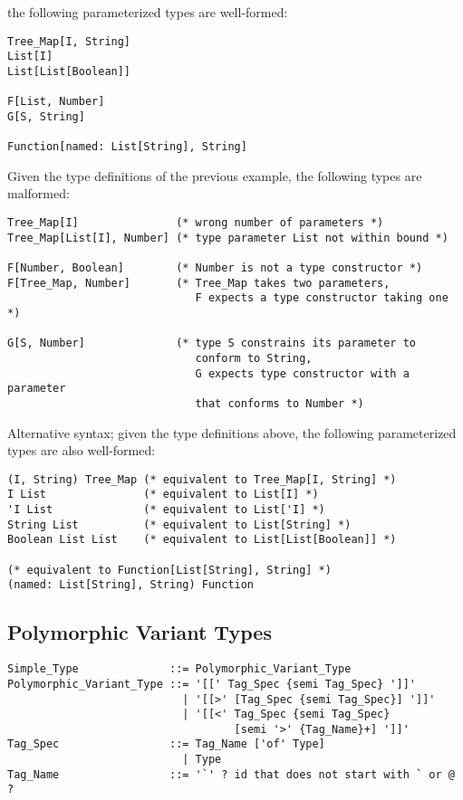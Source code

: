 the following parameterized types are well-formed: 

\begin{lstlisting}
Tree_Map[I, String]
List[I]
List[List[Boolean]]

F[List, Number]
G[S, String]

Function[named: List[String], String]
\end{lstlisting}

\example
\label{example:parameterized-types-mal}

Given the type definitions of the previous example, the following types are malformed: 

\begin{lstlisting}
Tree_Map[I]               (* wrong number of parameters *)
Tree_Map[List[I], Number] (* type parameter List not within bound *)

F[Number, Boolean]        (* Number is not a type constructor *)
F[Tree_Map, Number]       (* Tree_Map takes two parameters, 
                             F expects a type constructor taking one *)

G[S, Number]              (* type S constrains its parameter to
                             conform to String, 
                             G expects type constructor with a parameter
                             that conforms to Number *)
\end{lstlisting}

\example Alternative syntax; given the type definitions above, the following parameterized types are also well-formed:

\begin{lstlisting}
(I, String) Tree_Map (* equivalent to Tree_Map[I, String] *)
I List               (* equivalent to List[I] *)
'I List              (* equivalent to List['I] *)
String List          (* equivalent to List[String] *)
Boolean List List    (* equivalent to List[List[Boolean]] *)

(* equivalent to Function[List[String], String] *)
(named: List[String], String) Function
\end{lstlisting}





\subsection{Polymorphic Variant Types}
\label{sec:polymorphic-variant-types}

\syntax\begin{lstlisting}
Simple_Type              ::= Polymorphic_Variant_Type
Polymorphic_Variant_Type ::= '[[' Tag_Spec {semi Tag_Spec} ']]'
                           | '[[>' [Tag_Spec {semi Tag_Spec}] ']]'
                           | '[[<' Tag_Spec {semi Tag_Spec}
                                   [semi '>' {Tag_Name}+] ']]'
Tag_Spec                 ::= Tag_Name ['of' Type]
                           | Type
Tag_Name                 ::= '`' ? id that does not start with ` or @ ?
\end{lstlisting}

